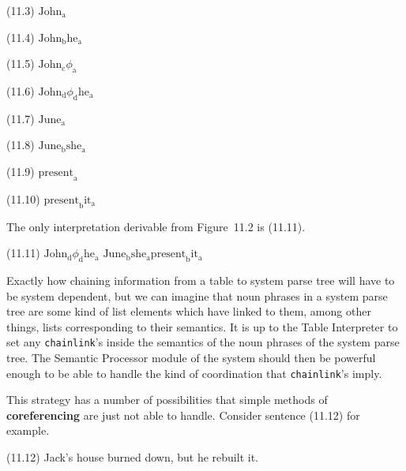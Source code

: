 \documentclass{article}
\begin{document}
\begin{enumerate*}
\item[(11.3)] ${\textrm{John}_{\textrm{a}}}$
\item[(11.4)] ${\textrm{John}_{\textrm{b}}}$${\textrm{he}_{\textrm{a}}}$
\item[(11.5)] ${\textrm{John}_{\textrm{c}}}$${\phi_{\textrm{a}}}$
\item[(11.6)] ${\textrm{John}_{\textrm{d}}}$${\phi_{\textrm{d}}}$${\textrm{he}_{\textrm{a}}}$
\item[(11.7)] ${\textrm{June}_{\textrm{a}}}$
\item[(11.8)] ${\textrm{June}_{\textrm{b}}}$${\textrm{she}_{\textrm{a}}}$
\item[(11.9)] ${\textrm{present}_{\textrm{a}}}$
\item[(11.10)] ${\textrm{present}_{\textrm{b}}}$${\textrm{it}_{\textrm{a}}}$
\end{enumerate*}

The only interpretation derivable from Figure~11.2 is
(11.11).

\begin{enumerate*}
\item[(11.11)] ${\textrm{John}_{\textrm{d}}}$${\phi_{\textrm{d}}}$${\textrm{he}_{\textrm{a}}}$\qquad
${\textrm{June}_{\textrm{b}}}$${\textrm{she}_{\textrm{a}}}$\qquad ${\textrm{present}_{\textrm{b}}}$${\textrm{it}_{\textrm{a}}}$
\end{enumerate*}

Exactly how chaining information from a table to system parse
tree will have to be system dependent, but we can imagine that
noun phrases in a system parse tree are some kind of list
elements which have linked to them, among other things, lists
corresponding to their semantics. It is up to the Table
Interpreter to set any \texttt{chainlink}'s inside the semantics
of the noun phrases of the system parse tree. The Semantic
Processor module of the system should then be powerful enough to
be able to handle the kind of coordination that
\texttt{chainlink}'s imply.

This strategy has a number of possibilities that simple methods
of \textbf{coreferencing} are just not able to handle.  Consider
sentence (11.12) for example.

\begin{enumerate*}
\item[(11.12)] Jack's house burned down, but he rebuilt it.
\end{enumerate*}
\end{document}
